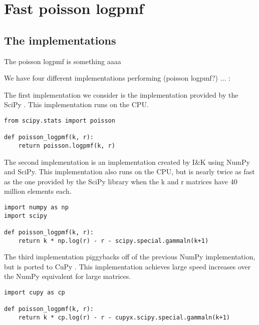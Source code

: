 \section{Fast poisson logpmf}
\subsection{The implementations}
The poisson logpmf is something aaaa

We have four different implementations performing (poisson logpmf?) ... :




The first implementation we consider is the implementation provided by the SciPy \cite{SciPy}.
This implementation runs on the CPU.
\begin{lstlisting}
from scipy.stats import poisson

def poisson_logpmf(k, r):
    return poisson.logpmf(k, r)
\end{lstlisting}

The second implementation is an implementation created by I\&K using NumPy \cite{NumPy} and SciPy.
This implementation also runs on the CPU, but is nearly twice as fast as the one provided by the SciPy library when the k and r matrices have 40 million elements each.
\begin{lstlisting}
import numpy as np
import scipy

def poisson_logpmf(k, r):
    return k * np.log(r) - r - scipy.special.gammaln(k+1)
\end{lstlisting}

The third implementation piggybacks off of the previous NumPy implementation, but is ported to CuPy \cite{CuPy}.
This implementation achieves large speed increases over the NumPy equivalent for large matrices.
\begin{lstlisting}
import cupy as cp 

def poisson_logpmf(k, r):
    return k * cp.log(r) - r - cupyx.scipy.special.gammaln(k+1)
\end{lstlisting}

